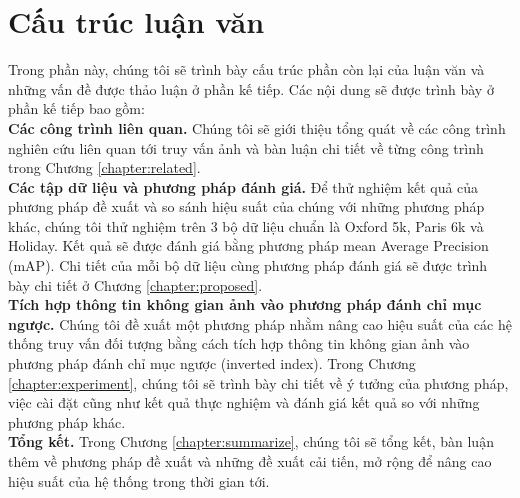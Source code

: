
\section{Cấu trúc luận văn}
Trong phần này, chúng tôi sẽ trình bày cấu trúc phần còn lại của luận văn và những vấn đề được thảo luận ở phần kế tiếp. Các nội dung sẽ được trình bày ở phần kế tiếp bao gồm:\\
 \textbf{Các công trình liên quan.} Chúng tôi sẽ giới thiệu tổng quát về các công trình nghiên cứu liên quan tới truy vấn ảnh và bàn luận chi tiết về từng công trình trong Chương \ref{chapter:related}.\\
 \textbf{Các tập dữ liệu và phương pháp đánh giá.} Để thử nghiệm kết quả của phương pháp đề xuất và so sánh hiệu suất của chúng với những phương pháp khác, chúng tôi thử nghiệm trên 3 bộ dữ liệu chuẩn là Oxford 5k, Paris 6k và Holiday. Kết quả sẽ được đánh giá bằng phương pháp mean Average Precision (mAP). Chi tiết của mỗi bộ dữ liệu cùng phương pháp đánh giá sẽ được trình bày chi tiết ở Chương \ref{chapter:proposed}.\\
 \textbf{Tích hợp thông tin không gian ảnh vào phương pháp đánh chỉ mục ngược.} Chúng tôi đề xuất một phương pháp nhằm nâng cao hiệu suất của các hệ thống truy vấn đối tượng bằng cách tích hợp thông tin không gian ảnh vào phương pháp đánh chỉ mục ngược (inverted index). Trong Chương \ref{chapter:experiment}, chúng tôi sẽ trình bày chi tiết về ý tưởng của phương pháp, việc cài đặt cũng như kết quả thực nghiệm và đánh giá kết quả so với những phương pháp khác.\\
 \textbf{Tổng kết.} Trong Chương \ref{chapter:summarize}, chúng tôi sẽ tổng kết, bàn luận thêm về phương pháp đề xuất và những đề xuất cải tiến, mở rộng để nâng cao hiệu suất của hệ thống trong thời gian tới.
 
